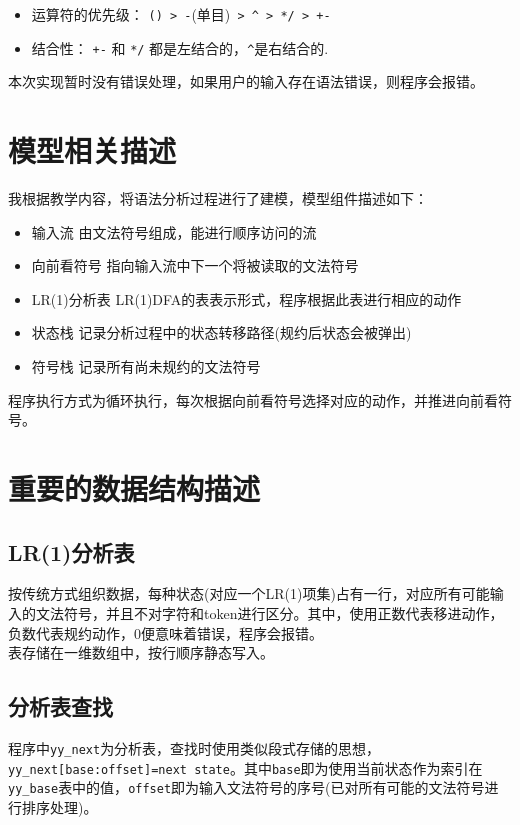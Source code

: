 \documentclass[a4paper]{ctexart} %
\begin{document}
	\begin{itemize}
		\item 运算符的优先级： \verb|() > -|(单目)\verb| > ^ > */ > +-|
		\item  结合性： \verb|+-| 和 \verb|*/| 都是左结合的，\verb|^|是右结合的.
	\end{itemize}


	本次实现暂时没有错误处理，如果用户的输入存在语法错误，则程序会报错。

	\section{模型相关描述}

	我根据教学内容，将语法分析过程进行了建模，模型组件描述如下：
	\begin{itemize}
        \item{输入流} 由文法符号组成，能进行顺序访问的流
        \item{向前看符号} 指向输入流中下一个将被读取的文法符号
        \item{LR(1)分析表} LR(1)DFA的表表示形式，程序根据此表进行相应的动作
        \item{状态栈} 记录分析过程中的状态转移路径(规约后状态会被弹出)
        \item{符号栈} 记录所有尚未规约的文法符号
	\end{itemize}
	程序执行方式为循环执行，每次根据向前看符号选择对应的动作，并推进向前看符号。


	\section{重要的数据结构描述}

	\subsection{LR(1)分析表}
	按传统方式组织数据，每种状态(对应一个LR(1)项集)占有一行，对应所有可能输入的文法符号，并且不对字符和token进行区分。其中，使用正数代表移进动作，负数代表规约动作，0便意味着错误，程序会报错。\\
	表存储在一维数组中，按行顺序静态写入。

	\subsection{分析表查找}
	程序中\verb|yy_next|为分析表，查找时使用类似段式存储的思想，\verb|yy_next[base:offset]=next state|。其中\verb|base|即为使用当前状态作为索引在\verb|yy_base|表中的值，\verb|offset|即为输入文法符号的序号(已对所有可能的文法符号进行排序处理)。
\end{document}
